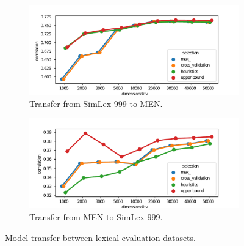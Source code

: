 \begin{figure}
  \centering

  \begin{subfigure}[t]{0.49\textwidth}
    \includegraphics[width=\textwidth]{supplement/figures/SimLex999-transfer}
    \caption{Transfer from SimLex-999 to MEN.}
    \label{fig:SimLex999-transfer}
  \end{subfigure}
  \begin{subfigure}[t]{0.49\textwidth}
    \includegraphics[width=\textwidth]{supplement/figures/men-transfer}
    \caption{Transfer from MEN to SimLex-999.}
    \label{fig:men-transfer}
  \end{subfigure}

  \caption{Model transfer between lexical evaluation datasets.}
  \label{fig:lexical-transfer}
\end{figure}

